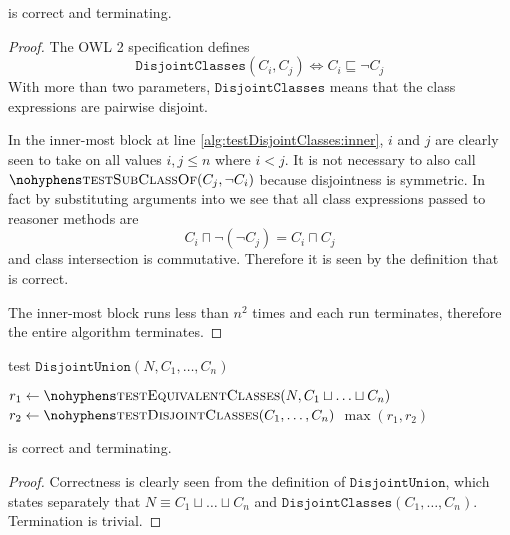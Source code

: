 \documentclass[paper.tex]{subfiles}
\begin{document}
\begin{theorem}
   is correct and terminating.
\end{theorem}
\begin{proof}
  The OWL 2 specification \cite{W3C:OWL2Syntax} defines
  \[ \mathtt{DisjointClasses}(C_i, C_j) \iff C_i \sqsubseteq \neg C_j \]
  With more than two parameters, $\mathtt{DisjointClasses}$ means that the class expressions are pairwise disjoint.

  In the inner-most block at line \ref{alg:testDisjointClasses:inner}, $i$ and $j$ are clearly seen to take on all values $i, j \le n$ where $i < j$.
  It is not necessary to also call $\textproc{testSubClassOf}(C_j, \neg C_i)$ because disjointness is symmetric.  In fact by substituting arguments into  we see that all class expressions passed to reasoner methods are
  \[ C_i \sqcap \neg (\neg C_j) = C_i \sqcap C_j \]
  and class intersection is commutative.  Therefore it is seen by the definition that  is correct.  \todo[unconvincing]

  The inner-most block runs less than $n^2$ times and each run terminates, therefore the entire algorithm terminates.
\end{proof}


\begin{algorithm}[H]
  \caption{test $\mathtt{DisjointUnion}(N, C_1, \ldots, C_n)$}
  \begin{algorithmic}[1]
    \raggedright
      \State $r_1 \gets \Call{testEquivalentClasses}{N, C_1 \sqcup \ldots \sqcup C_n}$
      \State $r_2 \gets \Call{testDisjointClasses}{C_1, \ldots, C_n}$
      \State \Return $\max(r_1, r_2)$
    \EndFunction
  \end{algorithmic}
\end{algorithm}

\begin{theorem}
   is correct and terminating.
\end{theorem}
\begin{proof}
  Correctness is clearly seen from the definition of $\mathtt{DisjointUnion}$, which states separately that $N \equiv C_1 \sqcup \ldots \sqcup C_n$ and $\mathtt{DisjointClasses}(C_1, \ldots, C_n)$.  Termination is trivial.
\end{proof}
\end{document}
